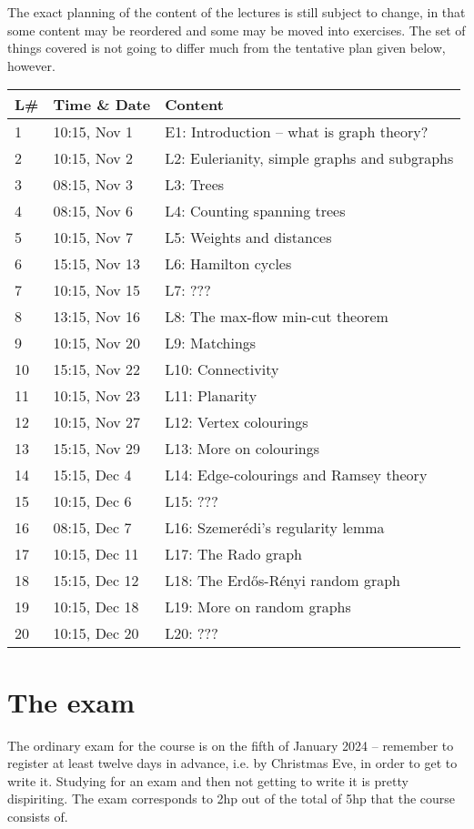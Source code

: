 \documentclass{tufte-handout}
\begin{document}
The exact planning of the content of the lectures is still subject to change, in that some content may be reordered and some may be moved into exercises. The set of things covered is not going to differ much from the tentative plan given below, however.

\begin{table}[h]
\begin{tabularx}{\textwidth}{llX}
L\# & Time \& Date      & Content \\ 
\midrule
1  & 10:15, Nov 1 & E1: Introduction -- what is graph theory?\\
2  & 10:15, Nov 2 & L2: Eulerianity, simple graphs and subgraphs\\
3  & 08:15, Nov 3 & L3: Trees\\
4  & 08:15, Nov 6 & L4: Counting spanning trees\\
5  & 10:15, Nov 7 & L5: Weights and distances\\
6  & 15:15, Nov 13 & L6: Hamilton cycles\\
7  & 10:15, Nov 15 & L7: ???\\
8  & 13:15, Nov 16 & L8: The max-flow min-cut theorem\\
9  & 10:15, Nov 20 & L9: Matchings\\
10 & 15:15, Nov 22 & L10: Connectivity\\
11 & 10:15, Nov 23 & L11: Planarity\\
12 & 10:15, Nov 27 & L12: Vertex colourings\\
13 & 15:15, Nov 29 & L13: More on colourings\\
14 & 15:15, Dec 4 & L14: Edge-colourings and Ramsey theory\\
15 & 10:15, Dec 6 & L15: ???\\
16 & 08:15, Dec 7 & L16: Szemerédi's regularity lemma\\
17 & 10:15, Dec 11 & L17: The Rado graph\\
18 & 15:15, Dec 12 & L18: The Erd\H{o}s-Rényi random graph\\
19 & 10:15, Dec 18 & L19: More on random graphs\\
20 & 10:15, Dec 20 & L20: ???
\end{tabularx}
\end{table}

\section{The exam}

The ordinary exam for the course is on the fifth of January 2024 -- remember to register at least twelve days in advance, i.e. by Christmas Eve, in order to get to write it. Studying for an exam and then not getting to write it is pretty dispiriting. The exam corresponds to 2hp out of the total of 5hp that the course consists of.
\end{document}
